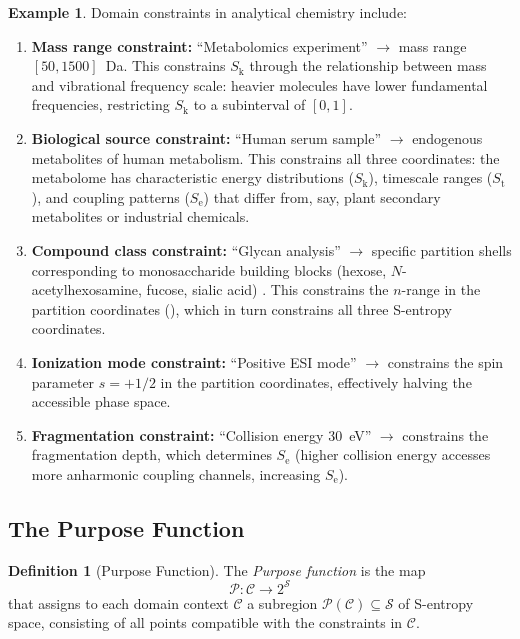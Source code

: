 \documentclass[11pt,twocolumn,a4paper]{article}
\theoremstyle{definition}
\newtheorem{definition}[theorem]{Definition}
\newtheorem{example}[theorem]{Example}
\theoremstyle{remark}
\newcommand{\Sk}{S_{\mathrm{k}}}
\newcommand{\St}{S_{\mathrm{t}}}
\newcommand{\Se}{S_{\mathrm{e}}}
\newcommand{\Sspace}{\mathcal{S}}
\newcommand{\Purpose}{\mathcal{P}}
\newcommand{\Context}{\mathcal{C}}
\begin{document}
\begin{example}\label{ex:constraints}
Domain constraints in analytical chemistry include:
\begin{enumerate}[label=(\alph*)]
  \item \textbf{Mass range constraint:} ``Metabolomics experiment'' $\to$ mass range $[50, 1500]$~Da. This constrains $\Sk$ through the relationship between mass and vibrational frequency scale: heavier molecules have lower fundamental frequencies, restricting $\Sk$ to a subinterval of $[0,1]$.

  \item \textbf{Biological source constraint:} ``Human serum sample'' $\to$ endogenous metabolites of human metabolism. This constrains all three coordinates: the metabolome has characteristic energy distributions ($\Sk$), timescale ranges ($\St$), and coupling patterns ($\Se$) that differ from, say, plant secondary metabolites or industrial chemicals.

  \item \textbf{Compound class constraint:} ``Glycan analysis'' $\to$ specific partition shells corresponding to monosaccharide building blocks (hexose, $N$-acetylhexosamine, fucose, sialic acid) \citep{varki2015}. This constrains the $n$-range in the partition coordinates (), which in turn constrains all three S-entropy coordinates.

  \item \textbf{Ionization mode constraint:} ``Positive ESI mode'' $\to$ constrains the spin parameter $s = +1/2$ in the partition coordinates, effectively halving the accessible phase space.

  \item \textbf{Fragmentation constraint:} ``Collision energy 30~eV'' $\to$ constrains the fragmentation depth, which determines $\Se$ (higher collision energy accesses more anharmonic coupling channels, increasing $\Se$).
\end{enumerate}
\end{example}

\subsection{The Purpose Function}\label{sec:purpose-func}

\begin{definition}[Purpose Function]\label{def:purpose-func}
The \emph{Purpose function} is the map
\begin{equation}\label{eq:purpose-func}
  \Purpose\colon \Context \to 2^{\Sspace}
\end{equation}
that assigns to each domain context $\Context$ a subregion $\Purpose(\Context) \subseteq \Sspace$ of S-entropy space, consisting of all points compatible with the constraints in $\Context$.
\end{definition}
\end{document}
